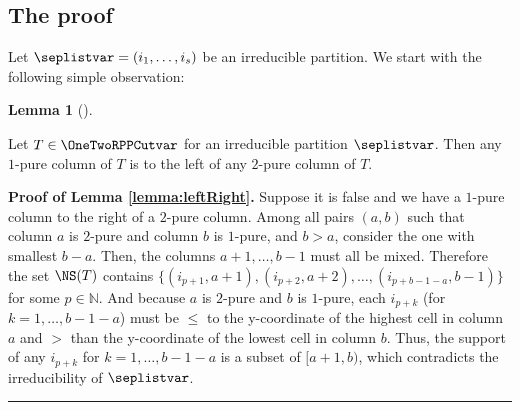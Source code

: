 \documentclass[numbers=enddot,12pt,final,onecolumn,notitlepage]{scrartcl}%
\theoremstyle{definition}
\newtheorem{lem}[theo]{Lemma}
\newenvironment{lemma}[1][]
{\begin{lem}[#1]\begin{leftbar}}
{\end{leftbar}\end{lem}}
\newenvironment{proof}[1][Proof]{\noindent\textbf{#1.} }{\ \rule{0.5em}{0.5em}}
\newcommand{\NN}{\mathbb{N}}
\begin{document}
\subsection{The proof}
Let $\seplistvar=(i_1,\dots,i_s)$ be an irreducible partition. We start with the following simple observation:
\begin{lemma}
\label{lemma:leftRight}
 Let $T\in\OneTwoRPPCutvar$ for an irreducible partition $\seplistvar$. Then any $1$-pure column of $T$ is to the left of any $2$-pure column of $T$.
\end{lemma}
\begin{proof}[Proof of Lemma \ref{lemma:leftRight}]
Suppose it is false and we have a $1$-pure column to the right of a $2$-pure column. Among all pairs $\left(a, b\right)$ such that column $a$ is $2$-pure and column $b$ is $1$-pure, and $b > a$, consider the one with smallest $b-a$. Then, the columns $a+1,\dots,b-1$ must all be mixed. %
Therefore the set $\NS(T)$ contains $\{(i_{p+1},a+1),(i_{p+2},a+2),\dots,(i_{p+b-1-a},b-1)\}$ for some $p\in\NN$. And because $a$ is $2$-pure and $b$ is $1$-pure, each $i_{p+k}$ (for $k=1,\dots, b-1-a$) must be $\leq$ to the y-coordinate of the highest cell in column $a$ and $>$ than the y-coordinate of the lowest cell in column $b$. Thus, the support of any $i_{p+k}$ for $k=1,\dots, b-1-a$ is a subset of $[a+1,b)$, which contradicts the irreducibility of $\seplistvar$.
\end{proof}
\end{document}
